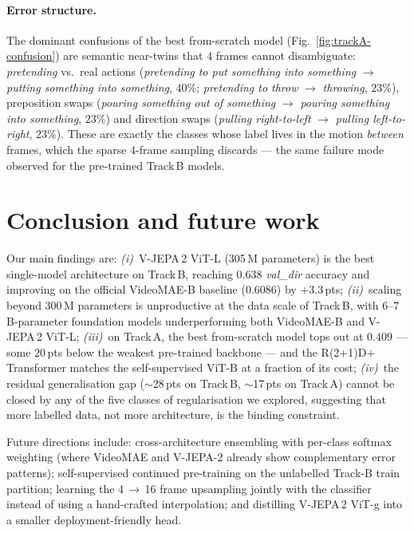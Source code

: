 \documentclass[10pt,twocolumn,letterpaper]{article}
\begin{document}
\paragraph{Error structure.}
The dominant confusions of the best from-scratch model
(Fig.~\ref{fig:trackA-confusion}) are semantic near-twins that 4 frames
cannot disambiguate: \emph{pretending} vs.\ real actions
(\emph{pretending to put something into something}
$\to$ \emph{putting something into something}, $40\%$;
\emph{pretending to throw} $\to$ \emph{throwing}, $23\%$),
preposition swaps (\emph{pouring something out of something}
$\to$ \emph{pouring something into something}, $23\%$) and direction
swaps (\emph{pulling right-to-left} $\to$ \emph{pulling left-to-right},
$23\%$). These are exactly the classes whose label lives in the motion
\emph{between} frames, which the sparse 4-frame sampling discards --- the
same failure mode observed for the pre-trained Track\,B models.

\section{Conclusion and future work}
\label{sec:conclusion}

Our main findings are: \emph{(i)}~V-JEPA\,2 ViT-L (305\,M parameters)
is the best single-model architecture on Track\,B, reaching
$0.638$ \emph{val\_dir} accuracy and improving on the official
VideoMAE-B baseline ($0.6086$) by $+3.3$\,pts; \emph{(ii)}~scaling
beyond 300\,M parameters is unproductive at the data scale of
Track\,B, with 6--7\,B-parameter foundation models underperforming
both VideoMAE-B and V-JEPA\,2 ViT-L; \emph{(iii)}~on Track\,A, the best
from-scratch model tops out at $0.409$ --- some $20$\,pts below the
weakest pre-trained backbone --- and the R(2+1)D$+$Transformer matches the
self-supervised ViT-B at a fraction of its cost; \emph{(iv)}~the residual
generalisation gap ($\sim$28\,pts on Track\,B, $\sim$17\,pts on Track\,A)
cannot be closed by any of the five classes of regularisation we explored,
suggesting that more labelled data, not more architecture, is the binding
constraint.

Future directions include: cross-architecture ensembling with
per-class softmax weighting (where VideoMAE and V-JEPA-2 already
show complementary error patterns); self-supervised continued
pre-training on the unlabelled Track-B train partition; learning
the 4\,$\rightarrow$\,16 frame upsampling jointly with the
classifier instead of using a hand-crafted interpolation; and
distilling V-JEPA\,2 ViT-g into a smaller deployment-friendly head.
\end{document}
